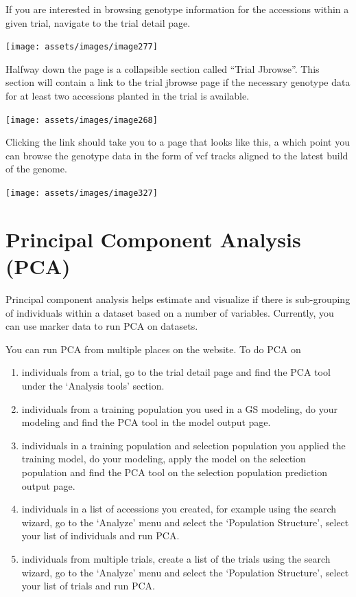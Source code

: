 \documentclass[
  12pt,
]{book}
\begin{document}
If you are interested in browsing genotype information for the accessions within a given trial, navigate to the trial detail page.

\begin{center}\texttt{[image: assets/images/image277]} \end{center}

Halfway down the page is a collapsible section called ``Trial Jbrowse''. This section will contain a link to the trial jbrowse page if the necessary genotype data for at least two accessions planted in the trial is available.

\begin{center}\texttt{[image: assets/images/image268]} \end{center}

Clicking the link should take you to a page that looks like this, a which point you can browse the genotype data in the form of vcf tracks aligned to the latest build of the genome.

\begin{center}\texttt{[image: assets/images/image327]} \end{center}

\hypertarget{principal-component-analysis-pca}{%
\section{Principal Component Analysis (PCA)}\label{principal-component-analysis-pca}}

Principal component analysis helps estimate and visualize if there is sub-grouping of individuals within a dataset based on a number of variables. Currently, you can use marker data to run PCA on datasets.

You can run PCA from multiple places on the website. To do PCA on

\begin{enumerate}
\def\labelenumi{(\arabic{enumi})}
\item
  individuals from a trial, go to the trial detail page and find the PCA tool under the `Analysis tools' section.
\item
  individuals from a training population you used in a GS modeling, do your modeling and find the PCA tool in the model output page.
\item
  individuals in a training population and selection population you applied the training model, do your modeling, apply the model on the selection population and find the PCA tool on the selection population prediction output page.
\item
  individuals in a list of accessions you created, for example using the search wizard, go to the `Analyze' menu and select the `Population Structure', select your list of individuals and run PCA.
\item
  individuals from multiple trials, create a list of the trials using the search wizard, go to the `Analyze' menu and select the `Population Structure', select your list of trials and run PCA.
\end{enumerate}
\end{document}
